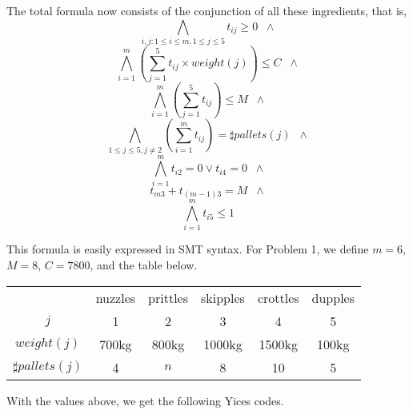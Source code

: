 \documentclass[11pt]{article}
\begin{document}
The total formula now consists of the conjunction of all these
ingredients, that is,
\[ \bigwedge_{i,j:1 \leq i \leq m, 1 \leq j \leq 5} t_{ij} \geq 0 \;\; \wedge \]
\[ \bigwedge_{i=1}^m  (\sum_{j=1}^5 t_{ij} \times weight(j)) \leq C \;\; \wedge \]
\[ \bigwedge_{i=1}^m (\sum_{j=1}^5 t_{ij}) \leq M \;\; \wedge \]
\[ \bigwedge_{1\leq j \leq5, j\neq2} (\sum_{i=1}^m t_{ij}) = \sharp pallets(j) \;\; \wedge \]
\[ \bigwedge_{i=1}^m t_{i2}=0 \vee t_{i4}=0 \;\; \wedge \]
\[ t_{m3} + t_{(m-1)3} = M \;\; \wedge \]
\[ \bigwedge_{i=1}^m t_{i5} \leq 1 \]

This formula is easily expressed in SMT syntax. For Problem 1, we define $m = 6$, $M = 8$, $C = 7800$, and the table below.
\begin{center}
\begin{tabular}{|c|c|c|c|c|c|}
  \hline
    & nuzzles & prittles & skipples & crottles & dupples \\
  $j$ & 1 & 2 & 3 & 4 & 5 \\
  $weight(j)$ & 700kg & 800kg & 1000kg & 1500kg & 100kg \\
  $\sharp pallets(j)$ & 4 & $n$ & 8 & 10 & 5 \\
  \hline
\end{tabular}
\end{center}

With the values above, we get the following Yices codes.
\end{document}
